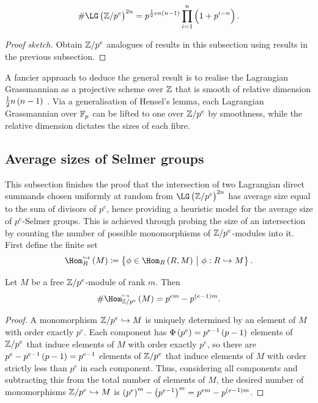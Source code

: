 \begin{proposition}
\label{prop:lagrangianring}
$$ \#\LG\br{\ZZ / p^e}^{2n} = p^{\frac{1}{2}en\br{n - 1}}\prod_{i = 1}^n \br{1 + p^{i - n}}. $$
\end{proposition}

\begin{proof}[Proof sketch]
Obtain $ \mathbb{Z} / p^e $ analogues of results in this subsection using results in the previous subsection.
\end{proof}

\begin{remark}
A fancier approach to deduce the general result is to realise the Lagrangian Grassmannian as a projective scheme over $ \mathbb{Z} $ that is smooth of relative dimension $ \tfrac{1}{2}n\br{n - 1} $ \cite[Lemma 4.8]{BKLPR15}. Via a generalisation of Hensel's lemma, each Lagrangian Grassmannian over $ \mathbb{F}_p $ can be lifted to one over $ \mathbb{Z} / p^e $ by smoothness, while the relative dimension dictates the sizes of each fibre.
\end{remark}

\pagebreak

\subsection{Average sizes of Selmer groups}

This subsection finishes the proof that the intersection of two Lagrangian direct summands chosen uniformly at random from $ \LG\br{\ZZ / p^e}^{2n} $ has average size equal to the sum of divisors of $ p^e $, hence providing a heuristic model for the average size of $ p^e $-Selmer groups. This is achieved through probing the size of an intersection by counting the number of possible monomorphisms of $ \mathbb{Z} / p^e $-modules into it. First define the finite set
$$ \Hom_R^{\hookrightarrow}\br{M} \coloneqq \cbr{\phi \in \Hom_R\br{R, M} \st \phi : R \hookrightarrow M}. $$

\begin{lemma}
\label{lem:monomorphismnumber}
Let $ M $ be a free $ \mathbb{Z} / p^e $-module of rank $ m $. Then
$$ \#\Hom_{\ZZ / p^e}^{\hookrightarrow}\br{M} = p^{em} - p^{\br{e - 1}m}. $$
\end{lemma}

\begin{proof}
A monomorphism $ \mathbb{Z} / p^e \hookrightarrow M $ is uniquely determined by an element of $ M $ with order exactly $ p^e $. Each component has $ \Phi\br{p^e} = p^{e - 1}\br{p - 1} $ elements of $ \mathbb{Z} / p^e $ that induce elements of $ M $ with order exactly $ p^e $, so there are $ p^e - p^{e - 1}\br{p - 1} = p^{e - 1} $ elements of $ \mathbb{Z} / p^e $ that induce elements of $ M $ with order strictly less than $ p^e $ in each component. Thus, considering all components and subtracting this from the total number of elements of $ M $, the desired number of monomorphisms $ \mathbb{Z} / p^e \hookrightarrow M $ is $ \br{p^e}^m - \br{p^{e - 1}}^m = p^{em} - p^{\br{e - 1}m} $.
\end{proof}

